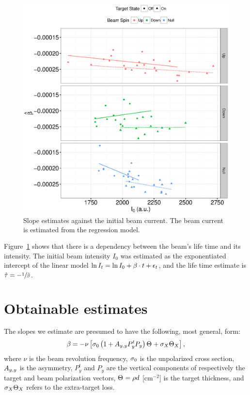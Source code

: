 \documentclass{article}
\begin{document}
\begin{figure}[h]
\begin{minipage}[t]{.5\textwidth}
			\includegraphics[scale=.5]{Slope_VS_IniCurrent_2016.eps}
			\caption{Slope estimates against the initial beam current. The beam current is estimated from the regression model.\label{fig:Slp_VS_I0}}
	\end{minipage}

\end{figure}

Figure~\ref{fig:Slp_VS_I0} shows that there is a dependency between the beam's life time and its intensity. The initial beam intensity $I_0$ was estimated as the exponentiated intercept of the linear model $\ln I_t = \ln I_0 + \slp\cdot t + \err_t$, and the life time estimate is $\hat{\tau} = -\sfrac{1}{\slp*}$. 

\section{Obtainable estimates}

The slopes we estimate are presumed to have the following, most general, form:
\begin{equation}
	\slp = -\nu\bkt*{\CS[0]\bkt{1 + \Ayy P^t_y P_y}\Thick + \CS[X]\Thick[X]},
\end{equation}
where $\nu$ is the beam revolution frequency, $\CS[0]$ is the unpolarized cross section, $\Ayy$ is the asymmetry, $P^t_y$ and $P_y$ are the vertical components of respectively the target and beam polarization vectors, $\Thick = \rho d$ [cm$^{-2}$] is the target thickness, and $\CS[X]\Thick[X]$ refers to the extra-target loss.
\end{document}
